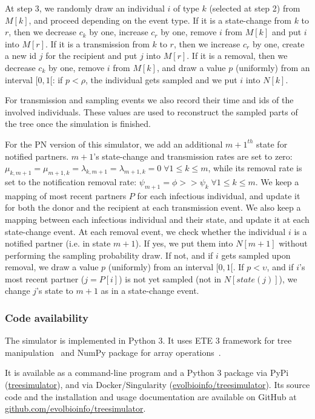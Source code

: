 \documentclass[a4paper,10pt]{article}
\begin{document}
At step 3, we randomly draw an individual $i$ of type $k$ (selected at step 2) from $M[k]$, and proceed depending on the event type. If it is a state-change from $k$ to $r$, then we decrease $c_k$ by one, increase $c_r$ by one, remove $i$ from $M[k]$ and put $i$ into $M[r]$. If it is a transmission from $k$ to $r$, then we increase $c_r$ by one, create a new id $j$ for the recipient and put $j$ into $M[r]$. If it is a removal, then we decrease $c_k$ by one, remove $i$ from $M[k]$, and draw a value $p$ (uniformly) from an interval $[0, 1[$: if $p < \rho$, the individual gets sampled and we put $i$ into $N[k]$. 

For transmission and sampling events we also record their time and ids of the involved individuals. These values are used to reconstruct the sampled parts of the tree once the simulation is finished.


For the PN version of this simulator, we add an additional $m+1^{th}$ state for notified partners. $m + 1$'s state-change and transmission rates are set to zero: $\mu_{k,m+1} = \mu_{m+1,k} = \lambda_{k,m+1} = \lambda_{m+1,k} = 0\; \forall 1 \leq k \leq m$, while its removal rate is set to the notification removal rate: $\psi_{m+1} = \phi >> \psi_k\; \forall 1 \leq k \leq m$. We keep a mapping of most recent partners $P$ for each infectious individual, and update it for both the donor and the recipient at each transmission event. We also keep a mapping between each infectious individual and their state, and update it at each state-change event. At each removal event, we check whether the individual $i$ is a notified partner (i.e. in state $m+1$). If yes, we put them into $N[m+1]$ without performing the sampling probability draw. If not, and if $i$ gets sampled upon removal, we draw a value $p$ (uniformly) from an interval $[0, 1[$. If $p < \upsilon$, and if $i$'s most recent partner ($j = P[i]$) is not yet sampled (not in $N[state(j)]$), we change $j$'s state to $m + 1$ as in a state-change event.

\subsubsection*{Code availability}
The simulator is implemented in Python 3. It uses ETE 3 framework for tree manipulation~\citep{Huerta-Cepas2016} and NumPy package for array operations~\citep{harris_array_2020}. 

It is available as a command-line program and a Python 3 package via PyPi (\href{https://pypi.org/project/treesimulator}{treesimulator}), and via Docker/Singularity (\href{https://hub.docker.com/r/evolbioinfo/treesimulator/tags}{evolbioinfo/treesimulator}). Its source code and the installation and usage documentation are available on GitHub at \href{https://github.com/evolbioinfo/treesimulator}{github.com/evolbioinfo/treesimulator}.
\end{document}
